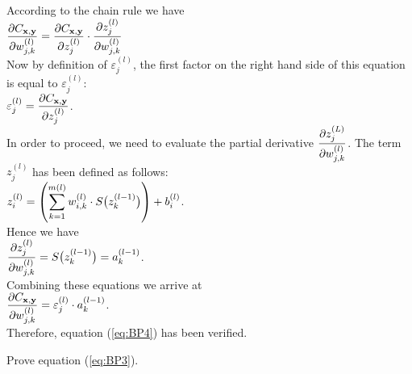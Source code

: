 According to the chain rule we have
\\[0.2cm]
\hspace*{1.3cm}
$ \displaystyle\frac{\partial C_{\mathbf{x}, \mathbf{y}}}{\partial w_{j,k}^{(l)}}  =  
  \frac{\partial C_{\mathbf{x}, \mathbf{y}}}{\partial z_j^{(l)}} \cdot \frac{\partial z_j^{(l)}}{\partial w_{j,k}^{(l)}} 
$ 
\\[0.2cm]
Now by definition of $\varepsilon_j^{(l)}$, the first factor on the right hand side of this equation is equal to $\varepsilon_j^{(l)}$: 
\\[0.2cm]
\hspace*{1.3cm}
$\displaystyle \varepsilon_j^{(l)} = \frac{\partial C_{\mathbf{x}, \mathbf{y}}}{\partial z_j^{(l)}}$.
\\[0.0cm]
In order to proceed, we need to evaluate the partial derivative
$\displaystyle\frac{\partial z_j^{(L)}}{\partial w_{j,k}^{(l)}}$.  The term $z_j^{(l)}$ has been defined as follows:
\\[0.2cm]
\hspace*{1.3cm}
$\displaystyle z_i^{(l)} = \left(\sum\limits_{k=1}^{m(l)} w_{i,k}^{(l)} \cdot S\bigl(z_k^{(l-1)}\bigr)\right) + b_i^{(l)}$.
\\[0.2cm]
Hence we have
\\[0.2cm]
\hspace*{1.3cm}
$\displaystyle\frac{\partial z_j^{(l)}}{\partial w_{j,k}^{(l)}} = S\bigl(z_k^{(l-1)}\bigr) = a_k^{(l-1)}$. 
\\[0.2cm]
Combining these equations we arrive at
\\[0.2cm]
\hspace*{1.3cm}
$ \displaystyle\frac{\partial C_{\mathbf{x}, \mathbf{y}}}{\partial w_{j,k}^{(l)}}  =  
  \varepsilon_j^{(l)} \cdot a_k^{(l-1)}
$. 
\\[0.2cm]
Therefore, equation (\ref{eq:BP4}) has been verified.

\exercise
Prove equation (\ref{eq:BP3}).
\eoxs

